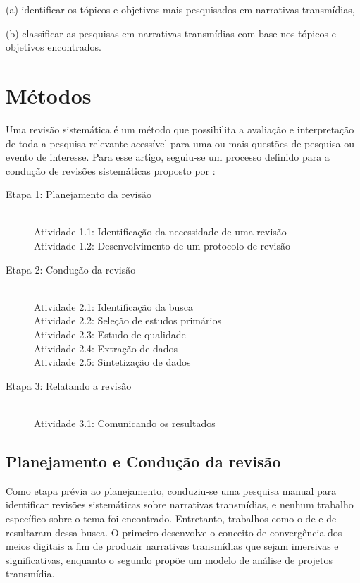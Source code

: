 \documentclass[
article,			%
11pt,				%
oneside,			%
a4paper,			%
english,			%
brazil,				%
sumario=tradicional
]{abntex2}
\begin{document}
  (a) identificar os tópicos e objetivos mais pesquisados em narrativas transmídias,

  (b) classificar as pesquisas em narrativas transmídias com base nos tópicos e objetivos encontrados.

  \section{Métodos}

  Uma revisão sistemática é um método que possibilita a avaliação e interpretação de toda a pesquisa relevante acessível para uma ou mais questões de pesquisa ou evento de interesse. Para esse artigo, seguiu-se um processo definido para a condução de revisões sistemáticas proposto por :

  \begin{description}
    \item[Etapa 1: Planejamento da revisão] \hfill \\
    Atividade 1.1: Identificação da necessidade de uma revisão \\
    Atividade 1.2: Desenvolvimento de um protocolo de revisão
    \item[Etapa 2: Condução da revisão] \hfill \\
    Atividade 2.1: Identificação da busca \\
    Atividade 2.2: Seleção de estudos primários \\
    Atividade 2.3: Estudo de qualidade \\
    Atividade 2.4: Extração de dados \\
    Atividade 2.5: Sintetização de dados
    \item[Etapa 3: Relatando a revisão] \hfill \\
    Atividade 3.1: Comunicando os resultados
  \end{description}

  \subsection{Planejamento e Condução da revisão}
  \label{subsec-planejamento}

  Como etapa prévia ao planejamento, conduziu-se uma pesquisa manual para identificar revisões sistemáticas sobre narrativas transmídias, e nenhum trabalho específico sobre o tema foi encontrado. Entretanto, trabalhos como o de  e de  resultaram dessa busca. O primeiro desenvolve o conceito de convergência dos meios digitais a fim de produzir narrativas transmídias que sejam imersivas e significativas, enquanto o segundo propõe um modelo de análise de projetos transmídia.
\end{document}
